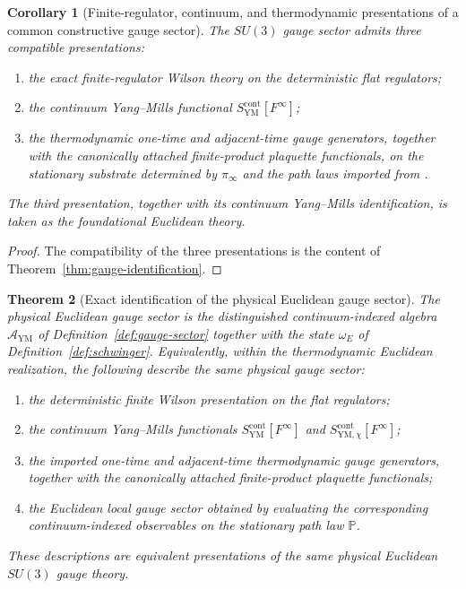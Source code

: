 \documentclass[11pt]{article}
\newtheorem{theorem}{Theorem}[section]
\newtheorem{corollary}[theorem]{Corollary}
\theoremstyle{definition}
\theoremstyle{remark}
\newcommand{\mcA}{\mathcal A}
\begin{document}
\begin{corollary}[Finite-regulator, continuum, and thermodynamic presentations of a common constructive gauge sector]
\label{cor:three-presentations}
The \(SU(3)\) gauge sector admits three compatible presentations:
\begin{enumerate}[label=\textnormal{(\roman*)},leftmargin=1.5em]
\item the exact finite-regulator Wilson theory on the deterministic flat
regulators;
\item the continuum Yang--Mills functional
\(S_{\mathrm{YM}}^{\mathrm{cont}}[F^\infty]\);
\item the thermodynamic one-time and adjacent-time gauge generators, together
with the canonically attached finite-product plaquette functionals, on the
stationary substrate determined by \(\pi_\infty\) and the path laws imported
from \cite{continuumqft}.
\end{enumerate}
The third presentation, together with its continuum Yang--Mills
identification, is taken as the foundational Euclidean theory.
\end{corollary}

\begin{proof}
The compatibility of the three presentations is the content of
Theorem~\ref{thm:gauge-identification}.
\end{proof}

\begin{theorem}[Exact identification of the physical Euclidean gauge sector]
\label{thm:exact-gauge-sector}
The physical Euclidean gauge sector is the
distinguished continuum-indexed algebra \(\mcA_{\mathrm{YM}}\) of
Definition~\ref{def:gauge-sector} together with the state
\(\omega_E\) of Definition~\ref{def:schwinger}.  Equivalently, within the
thermodynamic Euclidean realization, the following describe the same physical
gauge sector:
\begin{enumerate}[label=\textnormal{(\roman*)},leftmargin=1.5em]
\item the deterministic finite Wilson presentation on the flat regulators;
\item the continuum Yang--Mills functionals
\(S_{\mathrm{YM}}^{\mathrm{cont}}[F^\infty]\) and
\(S_{\mathrm{YM},\chi}^{\mathrm{cont}}[F^\infty]\);
\item the imported one-time and adjacent-time thermodynamic gauge generators,
together with the canonically attached finite-product plaquette functionals;
\item the Euclidean local gauge sector obtained by evaluating the corresponding
continuum-indexed observables on the stationary path law \(\mathbb P\).
\end{enumerate}
These descriptions are equivalent presentations of the same physical
Euclidean \(SU(3)\) gauge theory.
\end{theorem}
\end{document}
